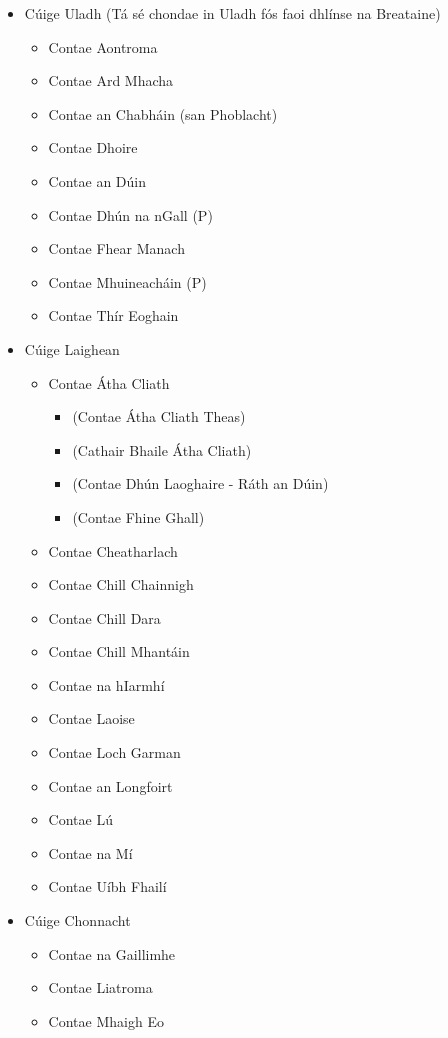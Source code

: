 \documentclass[a4paper,12pt]{article}
\theoremstyle{plain} %
\theoremstyle{definition} %
\theoremstyle{remark} %
\begin{document}
\begin{itemize}
	\item Cúige Uladh (Tá sé chondae in Uladh fós faoi dhlínse na Breataine) 
	\begin{itemize}
		\item Contae Aontroma
		\item Contae Ard Mhacha
		\item Contae an Chabháin (san Phoblacht)
		\item Contae Dhoire
		\item Contae an Dúin
		\item Contae Dhún na nGall (P)
		\item Contae Fhear Manach
		\item Contae Mhuineacháin (P)
		\item Contae Thír Eoghain
	\end{itemize}
	\item Cúige Laighean
	\begin{itemize}
		\item Contae Átha Cliath 
		\begin{itemize}
			\item (Contae Átha Cliath Theas)
			\item (Cathair Bhaile Átha Cliath)
			\item (Contae Dhún Laoghaire - Ráth an Dúin)
			\item (Contae Fhine Ghall)
		\end{itemize}
		\item Contae Cheatharlach
		\item Contae Chill Chainnigh
		\item Contae Chill Dara
		\item Contae Chill Mhantáin
		\item Contae na hIarmhí
		\item Contae Laoise
		\item Contae Loch Garman
		\item Contae an Longfoirt
		\item Contae Lú
		\item Contae na Mí
		\item Contae Uíbh Fhailí
	\end{itemize}
	\item Cúige Chonnacht
	\begin{itemize}
		\item Contae na Gaillimhe
		\item Contae Liatroma
		\item Contae Mhaigh Eo

\end{itemize}
\end{itemize}
\end{document}
